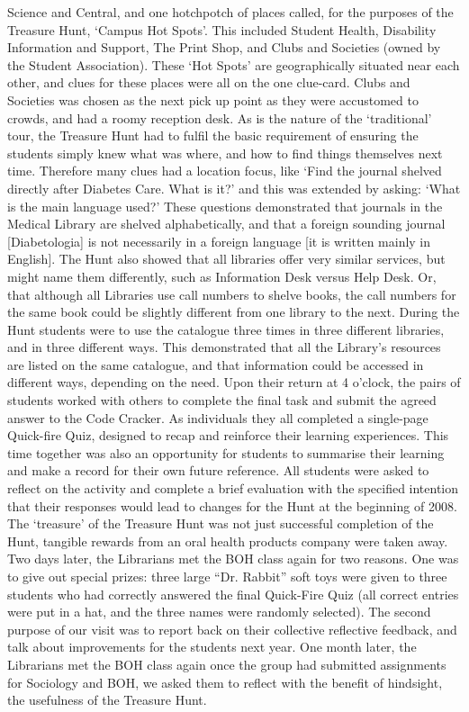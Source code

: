 Science and Central, and one hotchpotch of places called, for the purposes of the 
Treasure Hunt, ‘Campus Hot Spots’. This included Student Health, Disability Information 
and Support, The Print Shop, and Clubs and Societies (owned by the Student 
Association). These ‘Hot Spots’ are geographically situated near each other, and clues for
these places were all on the one clue-card. Clubs and Societies was chosen as the next 
pick up point as they were accustomed to crowds, and had a roomy reception desk. 
As is the nature of the ‘traditional’ tour, the Treasure Hunt had to fulfil the basic 
requirement of ensuring the students simply knew what was where, and how to find things 
themselves next time. Therefore many clues had a location focus, like ‘Find the journal 
shelved directly after Diabetes Care. What is it?’ and this was extended by asking: ‘What is 
the main language used?’ These questions demonstrated that journals in the Medical 
Library are shelved alphabetically, and that a foreign sounding journal [Diabetologia] is not 
necessarily in a foreign language [it is written mainly in English]. The Hunt also showed 
that all libraries offer very similar services, but might name them differently, such as 
Information Desk versus Help Desk. Or, that although all Libraries use call numbers to 
shelve books, the call numbers for the same book could be slightly different from one 
library to the next. 
During the Hunt students were to use the catalogue three times in three different libraries, 
and in three different ways. This demonstrated that all the Library’s resources are listed 
on the same catalogue, and that information could be accessed in different ways, 
depending on the need. Upon their return at 4 o’clock, the pairs of students worked with others to complete the 
final task and submit the agreed answer to the Code Cracker. As individuals they all 
completed a single-page Quick-fire Quiz, designed to recap and reinforce their learning 
experiences. This time together was also an opportunity for students to summarise their 
learning and make a record for their own future reference. All students were asked to 
reflect on the activity and complete a brief evaluation with the specified intention that their 
responses would lead to changes for the Hunt at the beginning of 2008. The ‘treasure’ of 
the Treasure Hunt was not just successful completion of the Hunt, tangible rewards from 
an oral health products company were taken away. 
Two days later, the Librarians met the BOH class again for two reasons. One was to give 
out special prizes: three large “Dr. Rabbit” soft toys were given to three students who had 
correctly answered the final Quick-Fire Quiz (all correct entries were put in a hat, and the 
three names were randomly selected). The second purpose of our visit was to report back 
on their collective reflective feedback, and talk about improvements for the students next 
year. One month later, the Librarians met the BOH class again once the group had 
submitted assignments for Sociology and BOH, we asked them to reflect with the benefit 
of hindsight, the usefulness of the Treasure Hunt. 

